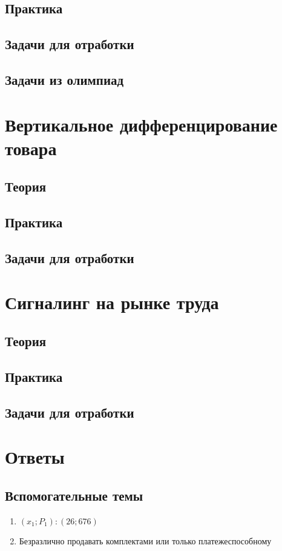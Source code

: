 
\subsection{Практика}
\subsection{Задачи для отработки}
\subsection{Задачи из олимпиад}
\begin{mybox}
    
\end{mybox}

\section{Вертикальное дифференцирование товара}
\subsection{Теория}
\subsection{Практика}
\subsection{Задачи для отработки}

\section{Сигналинг на рынке труда}
\subsection{Теория}
\subsection{Практика}
\subsection{Задачи для отработки}

\section{Ответы}
\subsection{Вспомогательные темы}
\begin{enumerate}
    \item $(x_1;P_1): (26;676)$
    \item Безразлично продавать комплектами или только платежеспособному
\end{enumerate}
